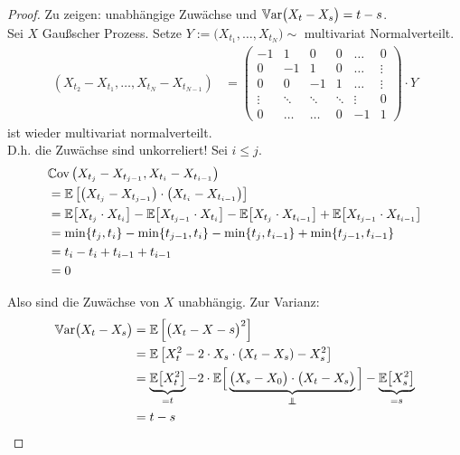 \begin{proof}
	Zu zeigen: unabhängige Zuwächse und $\mathbb{V}\text{ar}\big(X_t-X_s\big)=t-s$.\\
	Sei $X$ Gaußscher Prozess. 
	Setze $Y:=\big(X_{t_1},\ldots,X_{t_N}\big)\sim$ multivariat Normalverteilt.
	\begin{align*}
		\left(X_{t_2}-X_{t_1},\ldots,X_{t_N}-X_{t_{N-1}}\right)
		&=\begin{pmatrix}
			-1 & 1 & 0 & 0 & \hdots & 0\\
			0 & -1 & 1 & 0 & \hdots & \vdots\\
			0 & 0 & -1 & 1 & \hdots & \vdots\\
			\vdots & \ddots & \ddots & \ddots & \vdots & 0\\
			0 & \hdots & \hdots & 0 & -1 & 1
		\end{pmatrix}\cdot Y
	\end{align*}
	ist wieder multivariat normalverteilt.\\
	D.h. die Zuwächse sind unkorreliert!
	Sei $i\leq j$.
	\begin{align*}
		&\mathbb{C}\text{ov}\left(X_{t_j}-X_{t_{j-1}},X_{t_i}-X_{t_{i-1}}\right)\\
		&=\mathbb{E}\left[\left(X_{t_j}-X_{t_{j-1}}\right)\cdot\left(X_{t_i}-X_{t_{i-1}}\right)\right]\\
		&=\mathbb{E}\big[X_{t_j}\cdot X_{t_i}\big]-\mathbb{E}\big[X_{t_{j-1}}\cdot X_{t_i}\big]-\mathbb{E}\big[X_{t_j}\cdot X_{t_{i-1}}\big]+\mathbb{E}\big[X_{t_{j-1}}\cdot X_{t_{i-1}}\big]\\
		&=\min\lbrace t_j,t_i\rbrace-\min\lbrace t_{j-1},t_i\rbrace-\min\lbrace t_j,t_{i-1}\rbrace+\min\lbrace t_{j-1},t_{i-1}\rbrace\\
		&=t_i-t_i+t_{i-1}+t_{i-1}\\
		&=0
	\end{align*}
	
	Also sind die Zuwächse von $X$ unabhängig.
	Zur Varianz:
	\begin{align*}
		\Var\big(X_t-X_s\big)
		&=\E\left[\big(X_t-X-s\big)^2\right]\\
		&=\E\left[X_t^2-2\cdot X_s\cdot (X_t-X_s)-X_s^2\right]\\
		&=\underbrace{\E\big[X_t^2\big]}_{=t}-2\cdot\E\Big[\underbrace{\big(X_s-X_0\big)\cdot\big(X_t-X_s\big)}_{\unab}\Big]-\underbrace{\E\big[X_s^2\big]}_{=s}\\
		&=t-s
	\end{align*}
\end{proof}

